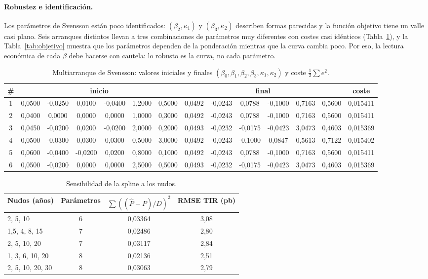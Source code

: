 \documentclass[a4paper,12pt]{article}
\begin{document}
\paragraph{Robustez e identificación.} Los parámetros de Svensson están poco identificados: $(\beta_2,\kappa_1)$ y $(\beta_3,\kappa_2)$ describen formas parecidas y la función objetivo tiene un valle casi plano. Seis arranques distintos llevan a tres combinaciones de parámetros muy diferentes con costes casi idénticos (Tabla~\ref{tab:arr}), y la Tabla~\ref{tab:objetivo} muestra que los parámetros dependen de la ponderación mientras que la curva cambia poco. Por eso, la lectura económica de cada $\beta$ debe hacerse con cautela: lo robusto es la curva, no cada parámetro.
\begin{table}[H]\centering\caption{Multiarranque de Svensson: valores iniciales y finales $(\beta_0,\beta_1,\beta_2,\beta_3,\kappa_1,\kappa_2)$ y coste $\tfrac12\sum e^2$.}\label{tab:arr}\scriptsize\setlength{\tabcolsep}{2pt}
\begin{tabular}{c cccccc cccccc c}\toprule \# & \multicolumn{6}{c}{inicio} & \multicolumn{6}{c}{final} & coste\\\midrule
1 & 0{,}0500 & -0{,}0250 & 0{,}0100 & -0{,}0400 & 1{,}2000 & 0{,}5000 & 0{,}0492 & -0{,}0243 & 0{,}0788 & -0{,}1000 & 0{,}7163 & 0{,}5600 & 0{,}015411 \\
2 & 0{,}0400 & 0{,}0000 & 0{,}0000 & 0{,}0000 & 1{,}0000 & 0{,}3000 & 0{,}0492 & -0{,}0243 & 0{,}0788 & -0{,}1000 & 0{,}7163 & 0{,}5600 & 0{,}015411 \\
3 & 0{,}0450 & -0{,}0200 & 0{,}0200 & -0{,}0200 & 2{,}0000 & 0{,}2000 & 0{,}0493 & -0{,}0232 & -0{,}0175 & -0{,}0423 & 3{,}0473 & 0{,}4603 & 0{,}015369 \\
4 & 0{,}0500 & -0{,}0300 & 0{,}0300 & 0{,}0300 & 0{,}5000 & 3{,}0000 & 0{,}0492 & -0{,}0243 & -0{,}1000 & 0{,}0847 & 0{,}5613 & 0{,}7122 & 0{,}015402 \\
5 & 0{,}0600 & -0{,}0400 & -0{,}0200 & 0{,}0200 & 0{,}8000 & 0{,}1000 & 0{,}0492 & -0{,}0243 & 0{,}0788 & -0{,}1000 & 0{,}7163 & 0{,}5600 & 0{,}015411 \\
6 & 0{,}0500 & -0{,}0200 & 0{,}0000 & 0{,}0000 & 2{,}5000 & 0{,}5000 & 0{,}0493 & -0{,}0232 & -0{,}0175 & -0{,}0423 & 3{,}0473 & 0{,}4603 & 0{,}015369 \\
\bottomrule\end{tabular}\end{table}
\begin{table}[H]\centering\caption{Sensibilidad de la spline a los nudos.}\footnotesize
\begin{tabular}{lccc}\toprule Nudos (años) & Parámetros & $\sum((\hat P-P)/D)^2$ & RMSE TIR (pb)\\\midrule
2, 5, 10 & 6 & 0{,}03364 & 3{,}08 \\
1{,}5, 4, 8, 15 & 7 & 0{,}02486 & 2{,}80 \\
2, 5, 10, 20 & 7 & 0{,}03117 & 2{,}84 \\
1, 3, 6, 10, 20 & 8 & 0{,}02136 & 2{,}51 \\
2, 5, 10, 20, 30 & 8 & 0{,}03063 & 2{,}79 \\
\bottomrule\end{tabular}\end{table}
\end{document}
